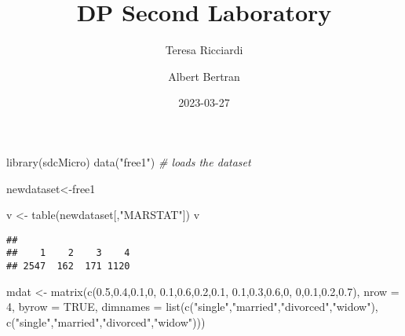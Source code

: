 \documentclass[
]{article}
\title{DP Second Laboratory}
\author{Teresa Ricciardi \and Albert Bertran}
\date{2023-03-27}
\newenvironment{Shaded}{\begin{snugshade}}{\end{snugshade}}
\newcommand{\AttributeTok}[1]{\textcolor[rgb]{0.77,0.63,0.00}{#1}}
\newcommand{\CommentTok}[1]{\textcolor[rgb]{0.56,0.35,0.01}{\textit{#1}}}
\newcommand{\ConstantTok}[1]{\textcolor[rgb]{0.00,0.00,0.00}{#1}}
\newcommand{\DecValTok}[1]{\textcolor[rgb]{0.00,0.00,0.81}{#1}}
\newcommand{\FloatTok}[1]{\textcolor[rgb]{0.00,0.00,0.81}{#1}}
\newcommand{\FunctionTok}[1]{\textcolor[rgb]{0.00,0.00,0.00}{#1}}
\newcommand{\NormalTok}[1]{#1}
\newcommand{\OtherTok}[1]{\textcolor[rgb]{0.56,0.35,0.01}{#1}}
\newcommand{\StringTok}[1]{\textcolor[rgb]{0.31,0.60,0.02}{#1}}
\begin{document}
\maketitle

\begin{Shaded}
\begin{Highlighting}[]
\FunctionTok{library}\NormalTok{(sdcMicro)}
\FunctionTok{data}\NormalTok{(}\StringTok{"free1"}\NormalTok{) }\CommentTok{\# loads the dataset}
\end{Highlighting}
\end{Shaded}

\begin{Shaded}
\begin{Highlighting}[]
\NormalTok{newdataset}\OtherTok{\textless{}{-}}\NormalTok{free1}
\end{Highlighting}
\end{Shaded}

\begin{Shaded}
\begin{Highlighting}[]
\NormalTok{v }\OtherTok{\textless{}{-}} \FunctionTok{table}\NormalTok{(newdataset[,}\StringTok{"MARSTAT"}\NormalTok{])}
\NormalTok{v}
\end{Highlighting}
\end{Shaded}

\begin{verbatim}
## 
##    1    2    3    4 
## 2547  162  171 1120
\end{verbatim}

\begin{Shaded}
\begin{Highlighting}[]
\NormalTok{mdat }\OtherTok{\textless{}{-}} \FunctionTok{matrix}\NormalTok{(}\FunctionTok{c}\NormalTok{(}\FloatTok{0.5}\NormalTok{,}\FloatTok{0.4}\NormalTok{,}\FloatTok{0.1}\NormalTok{,}\DecValTok{0}\NormalTok{,}
                 \FloatTok{0.1}\NormalTok{,}\FloatTok{0.6}\NormalTok{,}\FloatTok{0.2}\NormalTok{,}\FloatTok{0.1}\NormalTok{,}
                 \FloatTok{0.1}\NormalTok{,}\FloatTok{0.3}\NormalTok{,}\FloatTok{0.6}\NormalTok{,}\DecValTok{0}\NormalTok{,}
                 \DecValTok{0}\NormalTok{,}\FloatTok{0.1}\NormalTok{,}\FloatTok{0.2}\NormalTok{,}\FloatTok{0.7}\NormalTok{), }\AttributeTok{nrow =} \DecValTok{4}\NormalTok{, }\AttributeTok{byrow =} \ConstantTok{TRUE}\NormalTok{, }\AttributeTok{dimnames =} \FunctionTok{list}\NormalTok{(}\FunctionTok{c}\NormalTok{(}\StringTok{"single"}\NormalTok{,}\StringTok{"married"}\NormalTok{,}\StringTok{"divorced"}\NormalTok{,}\StringTok{"widow"}\NormalTok{), }\FunctionTok{c}\NormalTok{(}\StringTok{"single"}\NormalTok{,}\StringTok{"married"}\NormalTok{,}\StringTok{"divorced"}\NormalTok{,}\StringTok{"widow"}\NormalTok{)))}
\end{Highlighting}
\end{Shaded}
\end{document}
